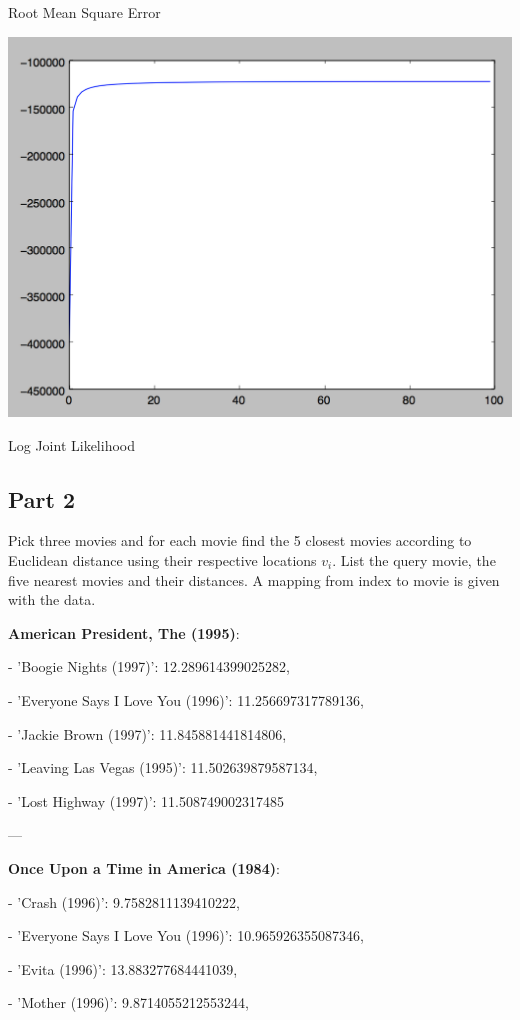 \documentclass[11pt]{article}
\begin{document}
Root Mean Square Error

\includegraphics[scale=.5]{images/ljl}

Log Joint Likelihood

\subsection*{Part 2}

Pick three movies and for each movie find the 5 closest movies according to Euclidean distance using their respective locations $v_i$. List the query movie, the five nearest movies and their distances. A mapping from index to movie is given with the data.

\textbf{American President, The (1995)}:

- 'Boogie Nights (1997)': 12.289614399025282,

 - 'Everyone Says I Love You (1996)': 11.256697317789136,

 - 'Jackie Brown (1997)': 11.845881441814806,

 - 'Leaving Las Vegas (1995)': 11.502639879587134,

 - 'Lost Highway (1997)': 11.508749002317485
 
 ---
 
\textbf{Once Upon a Time in America (1984)}:

- 'Crash (1996)': 9.7582811139410222,

- 'Everyone Says I Love You (1996)': 10.965926355087346,

- 'Evita (1996)': 13.883277684441039,

- 'Mother (1996)': 9.8714055212553244,
\end{document}
